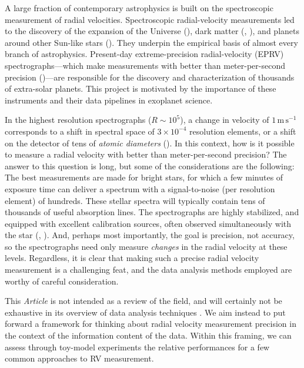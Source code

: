\documentclass[modern]{aastex631}
\newcommand{\unit}[1]{\mathrm{#1}}
\newcommand{\m}{\unit{m}}
\newcommand{\s}{\unit{s}}
\newcommand{\mps}{\m\,\s^{-1}}
\newcommand{\documentname}{\textsl{Article}}
\newcommand{\acronym}[1]{\textsc{#1}}
\newcommand{\EPRV}{\acronym{EPRV}}
\begin{document}
A large fraction of contemporary astrophysics is built on the spectroscopic measurement of radial velocities.
Spectroscopic radial-velocity measurements led to the discovery of the expansion of the Universe (\citealt{hubble}),
dark matter (\citealt{zwicky}, \citealt{rubin}),
and planets around other Sun-like stars (\citealt{mayor}).
They underpin the empirical basis of almost every branch of astrophysics.
Present-day extreme-precision radial-velocity (\EPRV) spectrographs---which make measurements with better than meter-per-second precision (\citealt{what?})---are responsible for the discovery and characterization of thousands of extra-solar planets.
This project is motivated by the importance of these instruments and their data pipelines in exoplanet science.

In the highest resolution spectrographs ($R\sim 10^5$), a change in velocity of $1\,\mps$ corresponds to a shift in spectral space of $3\times 10^{-4}$ resolution elements, or a shift on the detector of tens of \emph{atomic diameters} (\citealt{zhaophd}).
In this context, how is it possible to measure a radial velocity with better than meter-per-second precision?
The answer to this question is long, but some of the considerations are the following:
The best measurements are made for bright stars, for which a few minutes of exposure time can deliver a spectrum with a signal-to-noise (per resolution element) of hundreds.
These stellar spectra will typically contain tens of thousands of useful absorption lines.
The spectrographs are highly stabilized, and equipped with excellent calibration sources, often observed simultaneously with the star (\citealt{simultaneousreference}, \citealt{gascell}).
And, perhaps most importantly, the goal is precision, not accuracy, so the spectrographs need only measure \emph{changes} in the radial velocity at these levels.
Regardless, it is clear that making such a precise radial velocity measurement is a challenging feat, and the data analysis methods employed are worthy of careful consideration.

This \documentname{} is not intended as a review of the field, and will certainly not be exhaustive in its overview of data analysis techniques \citep[for the interested reader, we refer instead to the review by][]{Ford2022}. 
We aim instead to put forward a framework for thinking about radial velocity measurement precision in the context of the information content of the data. 
Within this framing, we can assess through toy-model experiments the relative performances for a few common approaches to RV measurement.
\end{document}
